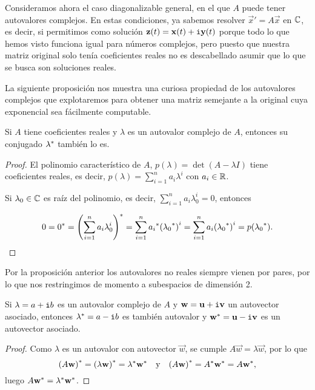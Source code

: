 \documentclass[../ecuaciones_diferenciales.tex]{subfiles}
\begin{document}
Consideramos ahora el caso diagonalizable general, en el que \(A\) puede tener
autovalores complejos. En estas condiciones, ya sabemos resolver 
\(\vec{x}' = A\vec{x}\) en \(\mathbb{C}\), es decir, si permitimos como solución 
\(\mathbf{z}(t) = \mathbf{x}(t) + \mathtt{i}\mathbf{y}(t)\) porque todo lo
que hemos visto funciona igual para números complejos, pero puesto que nuestra 
matriz original solo tenía coeficientes reales no es descabellado asumir que lo 
que se busca son soluciones reales.

La siguiente proposición nos muestra una curiosa
propiedad de los autovalores complejos que explotaremos para obtener una matriz
semejante a la original cuya exponencial sea fácilmente computable.

\begin{proposition}
	Si \(A\) tiene coeficientes reales y \(\lambda\) es un autovalor complejo 
	de \(A\), entonces su conjugado \({\lambda}^\ast\) también lo es.
\end{proposition}

\begin{proof}
	El polinomio característico de \(A\), \(p(\lambda) = \det(A - \lambda I)\)
	tiene coeficientes reales, es decir, \(p(\lambda) = \sum_{i=1}^n
	a_i\lambda^i\) con \(a_i \in \mathbb{R}\).

	Si \(\lambda_0 \in \mathbb{C}\) es raíz del polinomio, es decir, \(\sum_{i=1}^n
	a_i\lambda_0^i = 0\), entonces

	\[0 = \conjugate{0} = \conjugate{\parens{\sum_{i=1}^n a_i\lambda_0^i}} 
		= \sum_{i=1}^n \conjugate{a_i}{(\conjugate{\lambda_0})}^i 
		= \sum_{i=1}^n a_i{(\conjugate{\lambda_0})}^i 
		= p(\conjugate{\lambda_0}).\]
\end{proof}

Por la proposición anterior los autovalores no reales siempre vienen por pares,
por lo que nos restringimos de momento a subespacios de dimensión 2.

\begin{proposition}
	Si \(\lambda = a + \mathtt{i} b\) es un autovalor complejo de \(A\) y 
	\(\mathbf{w} = \mathbf{u} + \mathtt{i}\mathbf{v}\)
	un autovector asociado, entonces \({\lambda}^\ast = a - \mathtt{i} b\) 
	es también autovalor y \({\mathbf{w}}^\ast = \mathbf{u} - \mathtt{i} \mathbf{v}\) es un 
	autovector asociado.
\end{proposition}

\begin{proof}
	Como \(\lambda\) es un autovalor con autovector \(\vec{w}\), se cumple
	\(A\vec{w} = \lambda \vec{w}\), por lo que
	\[{(A\mathbf{w})}^\ast = {(\lambda \mathbf{w})}^\ast 
		= {\lambda}^\ast {\mathbf{w}}^\ast
		\quad \text{y} \quad
	{(A\mathbf{w})}^\ast = {A}^\ast {\mathbf{w}}^\ast 
		= A {\mathbf{w}}^\ast,\]
	luego \(A {\mathbf{w}}^\ast = {\lambda}^\ast {\mathbf{w}}^\ast\).
\end{proof}
\end{document}

